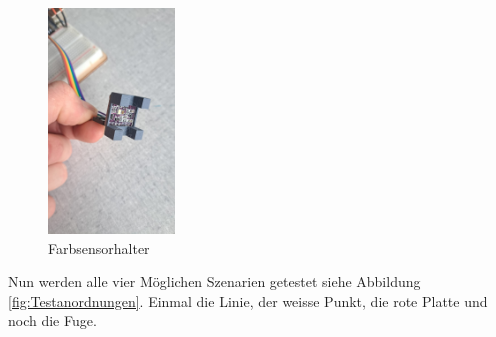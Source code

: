 \begin{figure}[h] %
    \centering
    \includegraphics[width=0.3\textwidth]{img/sensortest/FarbsensorHalter.jpg} %
    \caption{Farbsensorhalter}
    \label{fig:Farbsensorhalter} %
\end{figure}

Nun werden alle vier Möglichen Szenarien getestet siehe Abbildung \ref{fig:Testanordnungen}. Einmal die Linie, der weisse Punkt, die rote Platte und noch die Fuge.


